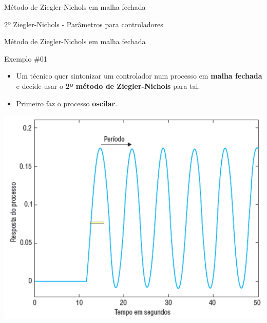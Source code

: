 \begin{frame}{Método de Ziegler-Nichols em malha fechada}
	\begin{block}{2º Ziegler-Nichols - Parâmetros para controladores}
	\end{block}
\end{frame}


\begin{frame}{Método de Ziegler-Nichols em malha fechada}
	\begin{block}{Exemplo \#01}
		\begin{itemize}
			\item Um técnico quer sintonizar um controlador num processo em \textbf{malha fechada} e decide usar o \textbf{2º método de Ziegler-Nichols} para tal.
			\item Primeiro faz o processo \textbf{oscilar}.
		\end{itemize}
	\end{block}
	
	\centering
	\includegraphics[width=0.55\linewidth]{Figuras/Ch14/fig3n2}
	
\end{frame}


